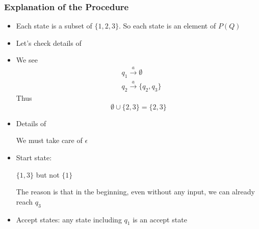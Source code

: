 \begin{frame}[allowframebreaks]
  \frametitle{Explanation of the Procedure}
\begin{itemize}
\item Each state is a subset of $\{1,2,3\}$. So each state is an element of $P(Q)$
\item Let's check details of

  \begin{center}
  \end{center}

\item We see
  \begin{equation*}
    \begin{split}
      & q_1 \xrightarrow{a} \emptyset\\
& q_2 \xrightarrow{a} \{q_2, q_3\}      
    \end{split}
  \end{equation*}
Thus
\begin{equation*}
  \emptyset \cup \{ 2, 3\} = \{2, 3\}
\end{equation*}
\item Details of

  \begin{center}
  \end{center}
We must take care of $\epsilon$
\item Start state:
  \begin{center}
    $\{1, 3\}$ but not $\{1\}$
  \end{center}
  The reason is that in the beginning, even without any
  input, we can already reach $q_3$
\item Accept states: any state including $q_1$ is an accept state
\end{itemize}
\end{frame}

